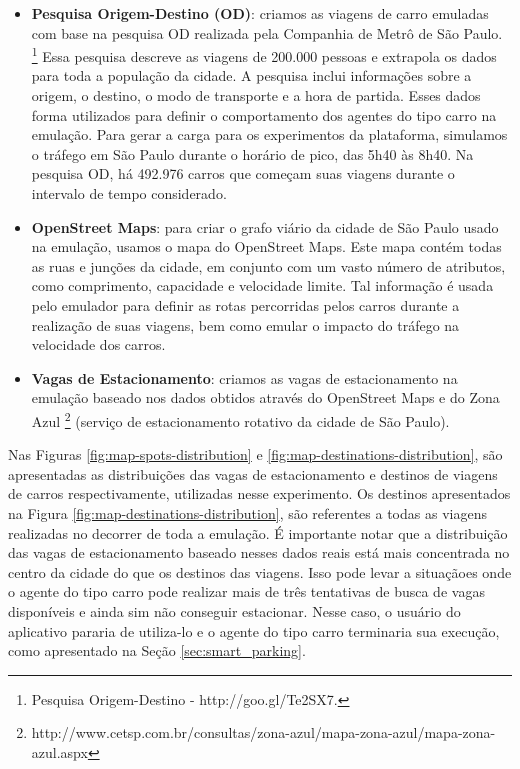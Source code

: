 \begin{itemize}
    \item \textbf{Pesquisa Origem-Destino (OD)}: criamos as viagens de carro emuladas com base na pesquisa OD realizada pela Companhia de Metrô de São Paulo.
        \footnote{Pesquisa Origem-Destino - http://goo.gl/Te2SX7.}
        Essa pesquisa descreve as viagens de 200.000 pessoas e extrapola os dados para toda a população da cidade.
        A pesquisa inclui informações sobre a origem, o destino, o modo de transporte e a hora de partida.
        Esses dados forma utilizados para definir o comportamento dos agentes do tipo carro na emulação.
        Para gerar a carga para os experimentos da plataforma, simulamos o tráfego em São Paulo durante o horário de pico, das 5h40 às 8h40.
        Na pesquisa OD, há 492.976 carros que começam suas viagens durante o intervalo de tempo considerado.

    \item \textbf{OpenStreet Maps}: para criar o grafo viário da cidade de São Paulo usado na emulação, usamos o mapa do OpenStreet Maps.
        Este mapa contém todas as ruas e junções da cidade, em conjunto com um vasto número de atributos, como comprimento, capacidade e velocidade limite.
        Tal informação é usada pelo emulador para definir as rotas percorridas pelos carros durante a realização de suas viagens, bem como emular o impacto do tráfego na velocidade dos carros.

    \item \textbf{Vagas de Estacionamento}: criamos as vagas de estacionamento na emulação baseado nos dados obtidos através do OpenStreet Maps e do Zona Azul
        \footnote{http://www.cetsp.com.br/consultas/zona-azul/mapa-zona-azul/mapa-zona-azul.aspx}
        (serviço de estacionamento rotativo da cidade de São Paulo).
\end{itemize}

Nas Figuras \ref{fig:map-spots-distribution} e \ref{fig:map-destinations-distribution}, são apresentadas as distribuições das vagas de estacionamento e destinos de viagens de carros respectivamente,
utilizadas nesse experimento.
Os destinos apresentados na Figura \ref{fig:map-destinations-distribution}, são referentes a todas as viagens realizadas no decorrer de toda a emulação.
É importante notar que a distribuição das vagas de estacionamento baseado nesses dados reais está mais concentrada no centro da cidade do que os destinos das viagens.
Isso pode levar a situaçãoes onde o agente do tipo carro pode realizar mais de três tentativas de busca de vagas disponíveis e ainda sim não conseguir estacionar.
Nesse caso, o usuário do aplicativo pararia de utiliza-lo e o agente do tipo carro terminaria sua execução, como apresentado na Seção \ref{sec:smart_parking}.

